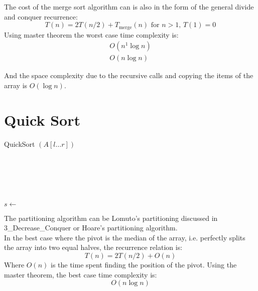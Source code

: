 \documentclass[12pt letter]{report}
\begin{document}
The cost of the merge sort algorithm can is also in the form of the general divide and conquer recurrence:
\[
  T \left( n \right) = 2 T \left( n / 2 \right)  + T_{\text{merge}} \left( n \right) \text{ for } n > 1, \, T \left( 1
  \right)  = 0
\]
Using master theorem the worst case time complexity is:
\begin{align*}
  O \left(n ^{1} \log n  \right) \\
  O \left( n \log n \right)
\end{align*}

And the space complexity due to the recursive calls and copying the items of the array is $O \left( \log n \right) $.

\chapter{Quick Sort}


\begin{algorithm}[H]
  \caption{QuickSort $ \left( A \left[ l\ldots r \right]  \right) $}
  \Comment{}\\
   \\
   \\
   \\
  \begin{algorithmic}[1]
    \State  $s \gets $  
    \State {}
    \State  {}
    \EndIf
  \end{algorithmic}
\end{algorithm}

The partitioning algorithm can be Lomuto's partitioning discussed in 3\_Decrease\_Conquer or Hoare's partitioning
algorithm.\\

In the best case where the pivot is the median of the array, i.e. perfectly splits the array into two equal halves, the
recurrence relation is:
\[
  T \left( n \right) = 2 T \left( n / 2 \right) + O \left( n \right)
\]
Where $O \left( n \right) $ is the time spent finding the position of the pivot. Using the master theorem, the best case
time complexity is:
\[
  O \left( n \log n \right)
\]
\end{document}
